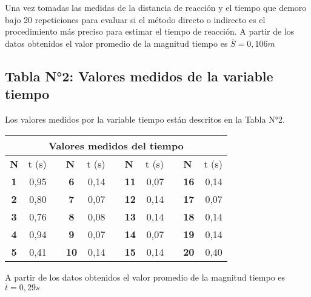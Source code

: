 \documentclass[runningheads]{llncs}
\begin{document}
        Una vez tomadas las medidas de la distancia de reacción y el tiempo que demoro bajo 20 repeticiones para evaluar si el método directo o indirecto es el procedimiento más preciso para estimar el tiempo de reacción. 
        A partir de los datos obtenidos el valor promedio de la magnitud tiempo es $\bar{S}=0,106m$
    \subsection*{Tabla N°2: Valores medidos de la variable tiempo}
    Los valores medidos por la variable tiempo están descritos en la Tabla N°2.\\
    \begin{table}[]
        \centering
        \begin{tabular}{crlcrlcrlcr}
            \hline 
            \multicolumn{11}{c}{\textbf{Valores medidos del tiempo}} \\ \hline 
            \multicolumn{1}{l}{\textbf{N}} & \multicolumn{1}{l}{t (s)} &  & \multicolumn{1}{l}{\textbf{N}} & \multicolumn{1}{l}{t (s)} &  & \multicolumn{1}{l}{\textbf{N}} & \multicolumn{1}{l}{t (s)} &  & \multicolumn{1}{l}{\textbf{N}} & \multicolumn{1}{l}{t (s)}\\ \hline 
            \textbf{1} & 0,95 &  & \textbf{6} & 0,14 &  & \textbf{11} & 0,07 &  & \textbf{16} & 0,14 \\
            \textbf{2} & 0,80 &  & \textbf{7} & 0,07 &  & \textbf{12} & 0,14 &  & \textbf{17} & 0,07 \\
            \textbf{3} & 0,76 &  & \textbf{8} & 0,08 &  & \textbf{13} & 0,14 &  & \textbf{18} & 0,14 \\
            \textbf{4} & 0,94 &  & \textbf{9} & 0,07 &  & \textbf{14} & 0,07 &  & \textbf{19} & 0,14 \\
            \textbf{5} & 0,41 &  & \textbf{10} & 0,14 &  & \textbf{15} & 0,14 &  & \textbf{20} & 0,40 \\ 
        \end{tabular}
    \end{table}
    A partir de los datos obtenidos el valor promedio de la magnitud tiempo es $\bar{t}=0,29s$
\end{document}

